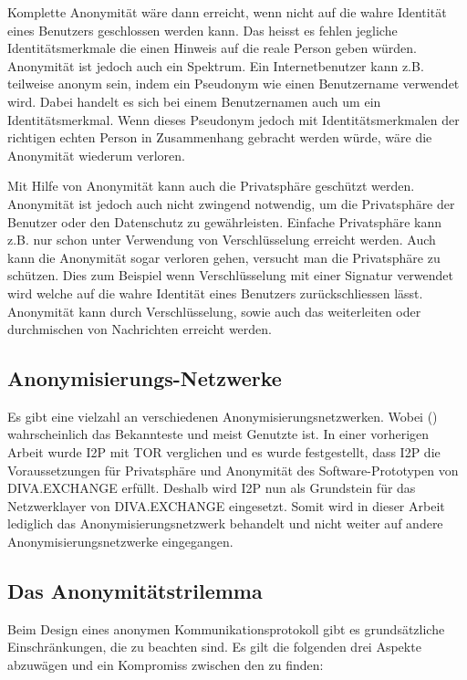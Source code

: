 Komplette Anonymität wäre dann erreicht, wenn nicht auf die wahre Identität eines Benutzers geschlossen werden kann.
Das heisst es fehlen jegliche Identitätsmerkmale die einen Hinweis auf die reale Person geben würden.
Anonymität ist jedoch auch ein Spektrum.
Ein Internetbenutzer kann z.B. teilweise anonym sein, indem ein Pseudonym wie einen Benutzername verwendet wird.
Dabei handelt es sich bei einem Benutzernamen auch um ein Identitätsmerkmal.
Wenn dieses Pseudonym jedoch mit Identitätsmerkmalen der richtigen echten Person in Zusammenhang gebracht werden würde,
wäre die Anonymität wiederum verloren.

Mit Hilfe von Anonymität kann auch die Privatsphäre geschützt werden.
Anonymität ist jedoch auch nicht zwingend notwendig, um die Privatsphäre der Benutzer oder den Datenschutz zu gewährleisten.
Einfache Privatsphäre kann z.B. nur schon unter Verwendung von Verschlüsselung erreicht werden.
Auch kann die Anonymität sogar verloren gehen, versucht man die Privatsphäre zu schützen.
Dies zum Beispiel wenn Verschlüsselung mit einer Signatur verwendet wird welche auf die wahre Identität eines Benutzers zurückschliessen lässt.
Anonymität kann durch Verschlüsselung, sowie auch das weiterleiten oder durchmischen von Nachrichten erreicht werden.


\subsection{Anonymisierungs-Netzwerke}

Es gibt eine vielzahl an verschiedenen Anonymisierungsnetzwerken.
Wobei  () wahrscheinlich das Bekannteste und meist Genutzte ist.
In einer vorherigen Arbeit wurde I2P mit TOR verglichen und es wurde festgestellt, dass I2P die Voraussetzungen für Privatsphäre und Anonymität des Software-Prototypen von DIVA.EXCHANGE \parencite[S~.28-30]{maric_untersuchung_2020} erfüllt.
Deshalb wird I2P nun als Grundstein für das Netzwerklayer von DIVA.EXCHANGE eingesetzt.
Somit wird in dieser Arbeit lediglich das Anonymisierungsnetzwerk  behandelt und nicht weiter auf andere Anonymisierungsnetzwerke eingegangen.

\subsection{Das Anonymitätstrilemma}\label{sec:anonymitytrilemma}

Beim Design eines anonymen Kommunikationsprotokoll gibt es grundsätzliche Einschränkungen, die zu beachten sind.
Es gilt die folgenden drei Aspekte abzuwägen und ein Kompromiss zwischen den zu finden:

